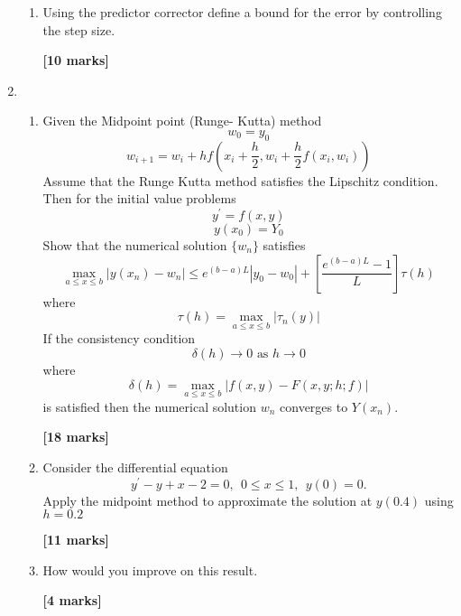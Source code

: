 \begin{enumerate}
\begin{enumerate}
\item
Using the predictor corrector define a bound for the error by controlling the
step size.
\begin{flushright}
\textbf{[10 marks]}
\end{flushright}
\end{enumerate}
\item
\begin{enumerate}
\item
Given the  Midpoint point (Runge- Kutta) method
\[w_0=y_0\]
\[w_{i+1}=w_{i}+hf(x_i+\frac{h}{2},w_i+\frac{h}{2}f(x_i,w_i) ) \]
Assume that the Runge Kutta method satisfies the Lipschitz condition. Then
for the initial value problems
\[ y^{'}=f(x,y)\]
\[ y(x_0)=Y_0 \]
Show that the numerical solution $\{ w_n\}$ satisfies
\[ \max_{a\leq x\leq b}|y(x_n)-w_n| \leq e^{(b-a)L}|y_0-w_0|+\left[\frac{e^{(b-a)L}-1}{L} \right]\tau(h) \]
where
\[\tau(h) = \max_{a\leq x\leq b}|\tau_n(y)|\]
If the consistency condition 
\[ \delta(h) \rightarrow 0 \mbox{ as  } h\rightarrow 0 \]
where
\[\delta(h) = \max_{a \leq x \leq b}|f(x,y)-F(x,y;h;f)| \]
is satisfied then the numerical solution $w_n$ converges to $Y(x_n)$.
\begin{flushright}
\textbf{[18 marks]}
\end{flushright}
\item
Consider the differential equation
\[y^{'}-y+x-2=0, \ \ 0\leq x \leq 1, \ \ y(0)=0.\]
Apply the midpoint method to approximate the solution at $y(0.4)$ using $h=0.2$\\
\begin{flushright}
\textbf{[11 marks]}
\end{flushright}
\item
How would you improve on this result.
\begin{flushright}
\textbf{[4 marks]}
\end{flushright}
\end{enumerate}
\end{enumerate}

